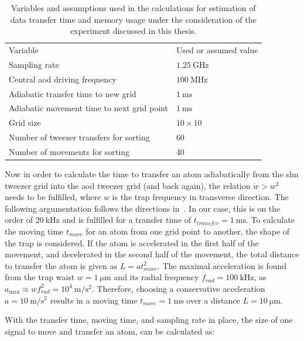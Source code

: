 \begin{table}[tbp]%
\label{tbl:spectrum_assumptions}
\centering
\begin{tabular}{l l}
	\toprule \toprule
	Variable & Used or assumed value \\ \thickhline%
	Sampling rate & $\SI{1.25}{\giga\hertz}$ \\
	Central \ac{aod} driving frequency & $\SI{100}{\mega\hertz}$ \\
	Adiabatic transfer time to new grid & $\SI{1}{\milli\second}$ \\
	Adiabatic movement time to next grid point & $\SI{1}{\milli\second}$ \\
	Grid size & $10\times10$ \\
	Number of tweezer transfers for sorting & 60 \\
	Number of movements for sorting & 40 \\
	\bottomrule \bottomrule
\end{tabular}
\caption{Variables and assumptions used in the calculations for estimation of data transfer time and memory usage under the consideration of the experiment discussed in this thesis.}
\end{table}

Now in order to calculate the time to transfer an atom adiabatically from the \ac{slm} tweezer grid into the \ac{aod} tweezer grid (and back again), the relation $\dot{w} > w^2$ needs to be fulfilled, where $w$ is the trap frequency in transverse direction. The following argumentation follows the directions in~\cite{Leseleuc2018}. In our case, this is on the order of $\SI{20}{\kilo\hertz}$ and is fulfilled for a transfer time of $t_{transfer} = \SI{1}{\milli\second}$. To calculate the moving time $t_{move}$ for an atom from one grid point to another, the shape of the trap is considered. If the atom is accelerated in the first half of the movement, and decelerated in the second half of the movement, the total distance to transfer the atom is given as $L=a t_{move}^2$. The maximal acceleration is found from the trap waist $w = \SI{1}{\micro\meter}$ and its radial frequency $f_{rad} = \SI{100}{\kilo\hertz}$, as $a_{\max} \approx w f_{rad}^2 = 10^4\SI{}{\meter\per\second\squared}$. Therefore, choosing a conservative acceleration $a=\SI{10}{\meter\per\second\squared}$ results in a moving time $t_{move} = \SI{1}{\milli\second}$ over a distance $L=\SI{10}{\micro\meter}$.

With the transfer time, moving time, and sampling rate in place, the size of one signal to move and transfer an atom, can be calculated as:

